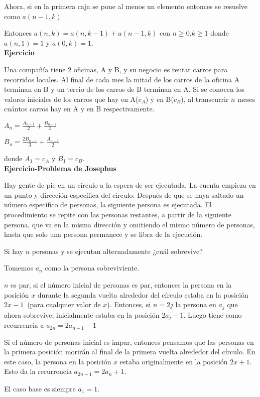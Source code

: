 \documentclass[a4paper,12pt]{report}
\begin{document}
Ahora, si en la primera caja se pone al menos un elemento entonces se resuelve como $a(n-1,k)$

Entonces $a(n,k)=a(n,k-1)+a(n-1,k)$ con $n\geq 0$,$k\geq 1$ donde $a(n,1)=1$ y $a(0,k)=1$.\\

\textbf{Ejercicio}

Una compañía tiene 2 oficinas, A y B, y su negocio es rentar carros para recorridos locales. Al final de cada mes la mitad de los carros de la oficina A terminan en B y un tercio de los carros de B terminan en A. Si se conocen los valores iniciales de los carros que hay en A($c_A$) y en B($c_B$), al transcurrir $n$ meses cuántos carros hay en A y en B respectivamente.

$A_n=\frac{A_{n-1}}{2}+\frac{B_{n-1}}{3}$

$B_n=\frac{2B_{n-1}}{3}+\frac{A_{n-1}}{2}$

donde $A_1=c_A$ y $B_1=c_B$.\\

\textbf{Ejercicio-Problema de Josephus}

Hay gente de pie en un círculo a la espera de ser ejecutada. La cuenta empieza en un punto y dirección específica del círculo. Después de que se haya saltado un número específico de personas, la siguiente persona es ejecutada. El procedimiento se repite con las personas restantes, a partir de la siguiente persona, que va en la misma dirección y omitiendo el mismo número de personas, hasta que solo una persona permanece y se libra de la ejecución.

Si hay $n$ personas y se ejecutan alternadamente ¿cuál sobrevive?

Tomemos $a_n$ como la persona sobreviviente.

$n$ es par, si el número inicial de personas es par, entonces la persona en la posición $x$ durante la segunda vuelta alrededor del círculo estaba en la posición $2x-1$~(para cualquier valor de $x$). Entonces, si $n=2j$ la persona en $a_j$ que ahora sobrevive, inicialmente estaba en la posición $2a_j-1$. Luego tiene como recurrencia a $a_{2n}=2a_{n-1}-1$

Si el número de personas inicial es impar, entonces pensamos que las personas en la primera posición morirán al final de la primera vuelta alrededor del círculo. En este caso, la persona en la posición $x$ estaba originalmente en la posición $2x+1$. Esto da la recurrencia $a_{2n+1}=2a_n+1$.

El caso base es siempre $a_1=1$.\\
\end{document}
